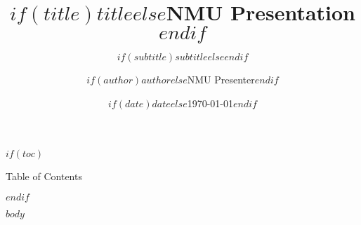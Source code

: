 \documentclass[$if(fontsize)$$fontsize$,$endif$$if(handout)$handout,$endif$$if(beamer)$ignorenonframetext,$endif$$for(classoption)$$classoption$$sep$,$endfor$]{beamer}
\title{$if(title)$$title$$else$NMU Presentation$endif$}
\subtitle{$if(subtitle)$$subtitle$$else$$endif$}
\author{$if(author)$$author$$else$NMU Presenter$endif$}
\institute{$if(institute)$$institute$$else$Nelson Mandela University$endif$}
\date{$if(date)$$date$$else$\today$endif$}
\begin{document}
\begin{frame}[plain]
  \titlepage
\end{frame}

$if(toc)$
\begin{frame}[allowframebreaks]{Table of Contents}
\tableofcontents
\end{frame}
$endif$

$body$
\end{document}
